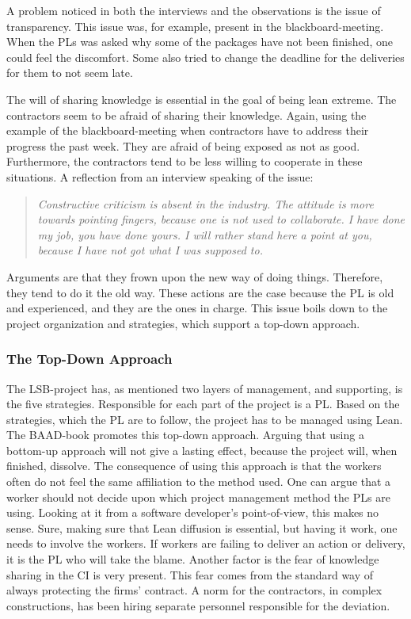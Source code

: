 A problem noticed in both the interviews and the observations is the issue of transparency. This issue was, for example, present in the blackboard-meeting. When the PLs was asked why some of the packages have not been finished, one could feel the discomfort. Some also tried to change the deadline for the deliveries for them to not seem late. 

The will of sharing knowledge is essential in the goal of being lean extreme. The contractors seem to be afraid of sharing their knowledge. Again, using the example of the blackboard-meeting when contractors have to address their progress the past week. They are afraid of being exposed as not as good. Furthermore, the contractors tend to be less willing to cooperate in these situations. A reflection from an interview speaking of the issue:
\begin{quote}
    \textit{Constructive criticism is absent in the industry. The attitude is more towards pointing fingers, because one is not used to collaborate. I have done my job, you have done yours. I will rather stand here a point at you, because I have not got what I was supposed to.}
\end{quote}

Arguments are that they frown upon the new way of doing things. Therefore, they tend to do it the old way. These actions are the case because the PL is old and experienced, and they are the ones in charge. This issue boils down to the project organization and strategies, which support a top-down approach. 

\subsubsection{The Top-Down Approach}
The LSB-project has, as mentioned two layers of management, and supporting, is the five strategies. Responsible for each part of the project is a PL. Based on the strategies, which the PL are to follow, the project has to be managed using Lean. The BAAD-book promotes this top-down approach. Arguing that using a bottom-up approach will not give a lasting effect, because the project will, when finished, dissolve. The consequence of using this approach is that the workers often do not feel the same affiliation to the method used. One can argue that a worker should not decide upon which project management method the PLs are using. Looking at it from a software developer's point-of-view, this makes no sense. Sure, making sure that Lean diffusion is essential, but having it work, one needs to involve the workers. If workers are failing to deliver an action or delivery, it is the PL who will take the blame. Another factor is the fear of knowledge sharing in the CI is very present. This fear comes from the standard way of always protecting the firms' contract. A norm for the contractors, in complex constructions, has been hiring separate personnel responsible for the deviation. 

